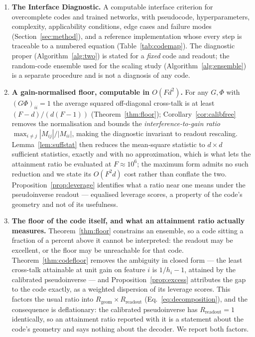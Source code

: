 \documentclass[preprint,12pt]{elsarticle}
\theoremstyle{definition}
\begin{document}
\begin{enumerate}[leftmargin=*]

\item \textbf{The Interface Diagnostic.} A computable interface criterion for overcomplete
codes and trained networks, with pseudocode, hyperparameters, complexity, applicability
conditions, edge cases and failure modes (Section~\ref{sec:method}), and a reference
implementation whose every step is traceable to a numbered equation
(Table~\ref{tab:codemap}). The diagnostic proper (Algorithm~\ref{alg:two}) is stated for a
\emph{fixed} code and readout; the random-code ensemble used for the scaling study
(Algorithm~\ref{alg:ensemble}) is a separate procedure and is not a diagnosis of any code.

\item \textbf{A gain-normalised floor, computable in $O(Fd^2)$.} For any $G,\Phi$ with
$(G\Phi)_{ii}=1$ the average squared off-diagonal cross-talk is at least $(F-d)/(d(F-1))$
(Theorem~\ref{thm:floor}); Corollary~\ref{cor:calibfree} removes the normalisation and bounds
the \emph{interference-to-gain ratio} $\max_{i\neq j}|M_{ij}|/|M_{ii}|$, making the diagnostic
invariant to readout rescaling. Lemma~\ref{lem:suffstat} then reduces the mean-square statistic
to $d\times d$ sufficient statistics, exactly and with no approximation, which is what lets the
attainment ratio be evaluated at $F\approx10^6$; the maximum form admits no such reduction and
we state its $O(F^2d)$ cost rather than conflate the two. Proposition~\ref{prop:leverage}
identifies what a ratio near one means under the pseudoinverse readout --- equalised leverage
scores, a property of the code's geometry and not of its usefulness.

\item \textbf{The floor of the code itself, and what an attainment ratio actually measures.}
Theorem~\ref{thm:floor} constrains an ensemble, so a code sitting a fraction of a percent above
it cannot be interpreted: the readout may be excellent, or the floor may be unreachable for that
code. Theorem~\ref{thm:codefloor} removes the ambiguity in closed form --- the least cross-talk
attainable at unit gain on feature $i$ is $1/h_i-1$, attained by the calibrated pseudoinverse ---
and Proposition~\ref{prop:excess} attributes the gap to the code exactly, as a weighted
dispersion of its leverage scores. This factors the usual ratio into
$R_{\mathrm{geom}}\times R_{\mathrm{readout}}$ (Eq.~\eqref{eq:decomposition}), and the
consequence is deflationary: the calibrated pseudoinverse has $R_{\mathrm{readout}}=1$
identically, so an attainment ratio reported with it is a statement about the code's geometry and
says nothing about the decoder. We report both factors.


\end{enumerate}
\end{document}
